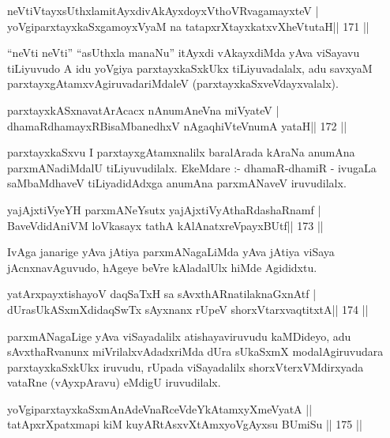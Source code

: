 \begin{shl}
neVtiVtayxsUthxlamitAyxdivAkAyxdoyxV\s thoVR\s vagamayxteV |
yoVgiparxtayxkaSxgamoyxV\s yaM na tatapxrXtayxkatxvXheVtutaH\hfill || 171 ||
\end{shl}

\begin{artha}
``neVti neVti'' ``asUthxla manaNu'' itAyxdi vAkayxdiMda yAva viSayavu tiLiyuvudo A idu yoVgiya parxtayxkaSxkUkx tiLiyuvadalalx, adu savxyaM parxtayxgAtamxvAgiruvadariMdaleV (parxtayxkaSxveVdayxvalalx).
\end{artha}

\begin{shl}
parxtayxkASxnavatArAcacx nAnumAneVna miVyateV |
dhamaRdhamayxRBisaMbanedhxV nAgaqhiVteV\s numA yataH\hfill || 172 ||
\end{shl}

\begin{artha}
parxtayxkaSxvu I parxtayxgAtamxnalilx baralArada kAraNa anumAna parxmANadiMdalU tiLiyuvudilalx. EkeMdare :- dhamaR-dhamiR - ivugaLa saMbaMdhaveV tiLiyadidAdxga anumAna parxmANaveV iruvudilalx.
\end{artha}

\begin{shl}
yajAjxtiVyeYH parxmANeYsutx yajAjxtiVyAthaRdashaRnamf |
BaveVdidAniVM loVkasayx tathA kAlAnatxreV\s payxBUtf\hfill || 173 ||
\end{shl}

\begin{artha}
IvAga janarige yAva jAtiya parxmANagaLiMda yAva jAtiya viSaya jAcnxnavAguvudo, hAgeye beVre kAladalUlx hiMde Agididxtu.
\end{artha}

\begin{shl}
yatArxpayxtishayoV daqSaTxH sa sAvxthARnatilaknaGxnAtf |
dUrasUkASxmXdidaqSwTx sAyxnanx rUpeV shorxVtarxvaqtitxtA\hfill || 174 ||
\end{shl}

\begin{artha}
parxmANagaLige yAva viSayadalilx atishayaviruvudu kaMDideyo, adu sAvxthaRvanunx miVrilalxvAdadxriMda dUra sUkaSxmX modalAgiruvudara parxtayxkaSxkUkx iruvudu, rUpada viSayadalilx shorxVterxVMdirxyada vataRne (vAyxpAravu) eMdigU iruvudilalx.
\end{artha}

\begin{shl}
yoVgiparxtayxkaSxmAnAdeVnaRceVdeYkAtamxyXmeVyatA ||
tatApxrXpatxmapi kiM kuyARtAsxvXtAmxyoVgAyxsu BUmiSu \hfill || 175 ||
\end{shl}

